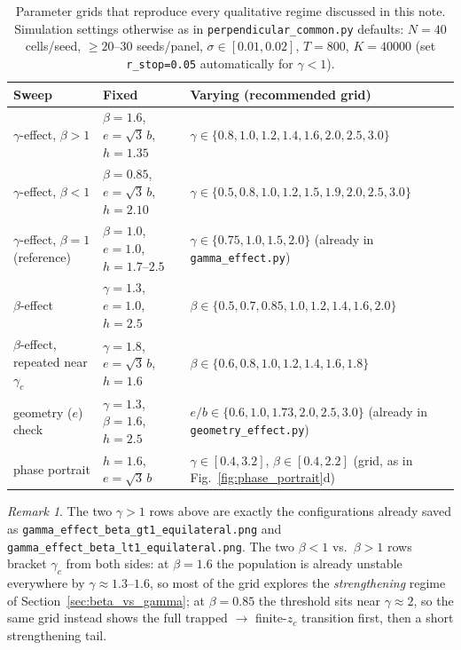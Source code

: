 \documentclass[11pt,a4paper]{article}
\theoremstyle{plain}
\theoremstyle{definition}
\theoremstyle{remark}
\newtheorem{remark}[theorem]{Remark}
\newcommand{\bw}{\beta}
\newcommand{\gc}{\gamma_c}
\begin{document}
\begin{table}[H]
\centering
\begin{tabular}{@{}lll@{}}
\toprule
Sweep & Fixed & Varying (recommended grid)\\
\midrule
$\gamma$-effect, $\bw>1$ & $\bw=1.6$, $e=\sqrt3\,b$, $h=1.35$ &
$\gamma\in\{0.8,1.0,1.2,1.4,1.6,2.0,2.5,3.0\}$\\
$\gamma$-effect, $\bw<1$ & $\bw=0.85$, $e=\sqrt3\,b$, $h=2.10$ &
$\gamma\in\{0.5,0.8,1.0,1.2,1.5,1.9,2.0,2.5,3.0\}$\\
$\gamma$-effect, $\bw=1$ (reference) & $\bw=1.0$, $e=1.0$, $h=1.7$--$2.5$ &
$\gamma\in\{0.75,1.0,1.5,2.0\}$ (already in \texttt{gamma\_effect.py})\\
$\bw$-effect & $\gamma=1.3$, $e=1.0$, $h=2.5$ &
$\bw\in\{0.5,0.7,0.85,1.0,1.2,1.4,1.6,2.0\}$\\
$\bw$-effect, repeated near $\gc$ & $\gamma=1.8$, $e=\sqrt3\,b$, $h=1.6$ &
$\bw\in\{0.6,0.8,1.0,1.2,1.4,1.6,1.8\}$\\
geometry ($e$) check & $\gamma=1.3$, $\bw=1.6$, $h=2.5$ &
$e/b\in\{0.6,1.0,1.73,2.0,2.5,3.0\}$ (already in \texttt{geometry\_effect.py})\\
phase portrait & $h=1.6$, $e=\sqrt3\,b$ &
$\gamma\in[0.4,3.2]$, $\bw\in[0.4,2.2]$ (grid, as in Fig.~\ref{fig:phase_portrait}d)\\
\bottomrule
\end{tabular}
\caption{Parameter grids that reproduce every qualitative regime discussed
in this note. Simulation settings otherwise as in
\texttt{perpendicular\_common.py} defaults: $N=40$ cells/seed, $\geq20$--30
seeds/panel, $\sigma\in[0.01,0.02]$, $T=800$, $K=40000$ (set
\texttt{r\_stop=0.05} automatically for $\gamma<1$).}
\end{table}

\begin{remark}
The two $\gamma>1$ rows above are exactly the configurations already saved
as \texttt{gamma\_effect\_beta\_gt1\_equilateral.png} and
\texttt{gamma\_effect\_beta\_lt1\_equilateral.png}. The two $\bw<1$ vs.\
$\bw>1$ rows bracket $\gc$ from both sides: at $\bw=1.6$ the population is
already unstable everywhere by $\gamma\approx1.3$--$1.6$, so most of the
grid explores the \emph{strengthening} regime of
Section~\ref{sec:beta_vs_gamma}; at $\bw=0.85$ the threshold sits near
$\gamma\approx2$, so the same grid instead shows the full trapped
$\to$ finite-$z_c$ transition first, then a short strengthening tail.
\end{remark}
\end{document}
